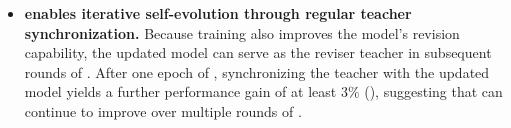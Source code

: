 \begin{itemize}


    \item {}\textbf{\ours{} enables iterative self-evolution through regular teacher synchronization.}
    Because training also improves the model’s revision capability, the updated model can serve as the reviser teacher in subsequent rounds of \opsd{}. After one epoch of \opsd{}, synchronizing the teacher with the updated model yields a further performance gain of at least $3\%$ (), suggesting that \ours{} can continue to improve over multiple rounds of \opsd{}.

\end{itemize}
